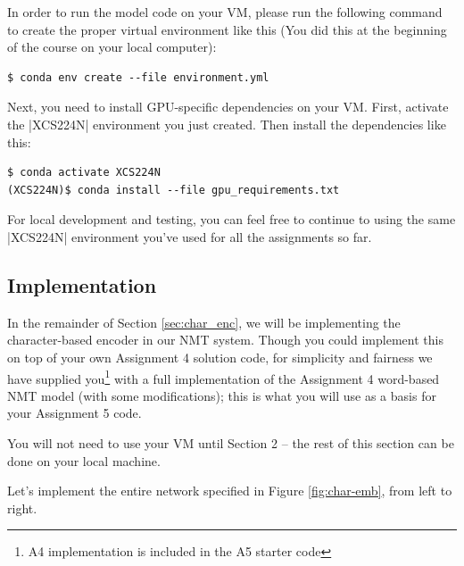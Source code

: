 In order to run the model code on your VM, please run the following command to create the proper virtual environment like this (You did this at the beginning of the course on your local computer):

\begin{lstlisting}
$ conda env create --file environment.yml
\end{lstlisting}

Next, you need to install GPU-specific dependencies on your VM.  First, activate the |XCS224N| environment you just created.  Then install the dependencies like this:

\begin{lstlisting}
$ conda activate XCS224N
(XCS224N)$ conda install --file gpu_requirements.txt
\end{lstlisting}

For local development and testing, you can feel free to continue to using the same |XCS224N| environment you've used for all the assignments so far.

\subsection*{Implementation}
In the remainder of Section \ref{sec:char_enc}, we will be implementing the character-based encoder in our NMT system.
Though you could implement this on top of your own Assignment 4 solution code, for simplicity and fairness we have supplied you\footnote{A4 implementation is included in the A5 starter code} with a full implementation of the Assignment 4 word-based NMT model (with some modifications); this is what you will use as a basis for your Assignment 5 code. 

You will not need to use your VM until Section 2 -- the rest of this section can be done on your local machine.

Let's implement the entire network specified in Figure \ref{fig:char-emb}, from left to right.

